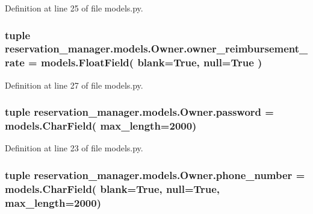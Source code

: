 Definition at line 25 of file models.\-py.

\hypertarget{classreservation__manager_1_1models_1_1Owner_a63136fe73cb79c9fb8cae6380af6b666}{
\subsubsection[{owner\-\_\-reimbursement\-\_\-rate}]{\setlength{\rightskip}{0pt plus 5cm}tuple reservation\-\_\-manager.\-models.\-Owner.\-owner\-\_\-reimbursement\-\_\-rate = models.\-Float\-Field( blank=True, null=True )\hspace{0.3cm}{\ttfamily [static]}}}\label{classreservation__manager_1_1models_1_1Owner_a63136fe73cb79c9fb8cae6380af6b666}


Definition at line 27 of file models.\-py.

\hypertarget{classreservation__manager_1_1models_1_1Owner_a9a3598a66af055f662af779e836e9b21}{
\subsubsection[{password}]{\setlength{\rightskip}{0pt plus 5cm}tuple reservation\-\_\-manager.\-models.\-Owner.\-password = models.\-Char\-Field( max\-\_\-length=2000)\hspace{0.3cm}{\ttfamily [static]}}}\label{classreservation__manager_1_1models_1_1Owner_a9a3598a66af055f662af779e836e9b21}


Definition at line 23 of file models.\-py.

\hypertarget{classreservation__manager_1_1models_1_1Owner_a5dfa25b100a3201b98c9646fcfd7c06c}{
\subsubsection[{phone\-\_\-number}]{\setlength{\rightskip}{0pt plus 5cm}tuple reservation\-\_\-manager.\-models.\-Owner.\-phone\-\_\-number = models.\-Char\-Field( blank=True, null=True, max\-\_\-length=2000)\hspace{0.3cm}{\ttfamily [static]}}}\label{classreservation__manager_1_1models_1_1Owner_a5dfa25b100a3201b98c9646fcfd7c06c}


